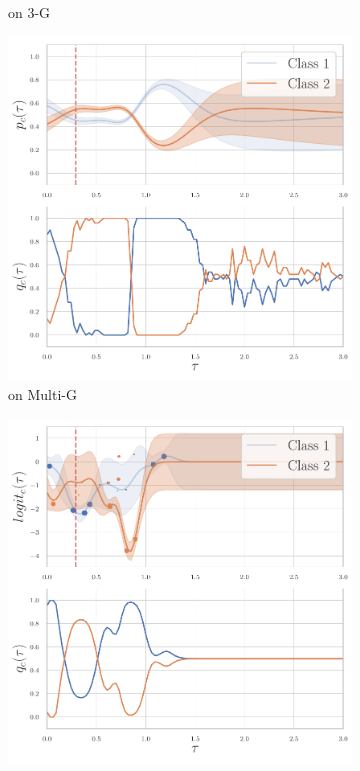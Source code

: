 \begin{figure}
\begin{subfigure}{.24\textwidth}
        \caption*{\GPModel on 3-G}
    \end{subfigure}
        \begin{subfigure}{.24\textwidth}
        \centering
        \includegraphics[width=\linewidth]{images/shifted-gaussians-multi-dirichlet.pdf}
        \caption*{\DirModel on Multi-G}
    \end{subfigure}
    \begin{subfigure}{.24\textwidth}
        \centering
        \includegraphics[width=\linewidth]{images/shifted-gaussians-multi-gaussian-process.pdf}

\end{subfigure}
\end{figure}
